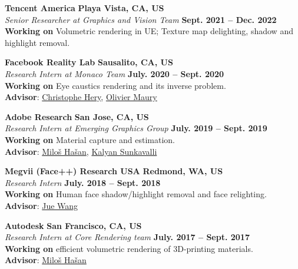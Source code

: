 \documentclass[margin,line]{resume}
\begin{document}
\begin{resume}
	\vspace{0.0mm}

	\textbf{Tencent America} \hfill \textbf{Playa Vista, CA, US} \\
	\textsl{Senior Researcher at Graphics and Vision Team} \hfill \textbf{Sept. 2021 -- Dec. 2022}\\
	\textbf{Working on} Volumetric rendering in UE; Texture map delighting, shadow and highlight removal.\\
	
	\vspace{0.0mm}

	\textbf{Facebook Reality Lab} \hfill \textbf{Sausalito, CA, US} \\
	\textsl{Research Intern at Monaco Team} \hfill \textbf{July. 2020 -- Sept. 2020}\\
	\textbf{Working on} Eye caustics rendering and its inverse problem.\\
	\textbf{Advisor}: \href{https://graphics.pixar.com/library/indexAuthorChristophe_Hery.html}{Christophe Hery}, \href{https://www.imdb.com/name/nm1436524/}{Olivier Maury}       

    \vspace{0.0mm}

	\textbf{Adobe Research} \hfill \textbf{San Jose, CA, US} \\
	\textsl{Research Intern at Emerging Graphics Group} \hfill \textbf{July. 2019 -- Sept. 2019}\\
	\textbf{Working on} Material capture and estimation.\\
	\textbf{Advisor}: \href{http://miloshasan.net/}{Milo\v{s} Ha\v{s}an}, \href{https://research.adobe.com/person/kalyan-sunkavalli/}{Kalyan Sunkavalli}       

    \vspace{0.0mm}

	\textbf{Megvii (Face++) Research USA} \hfill \textbf{Redmond, WA, US} \\
	\textsl{Research Intern} \hfill \textbf{July. 2018 -- Sept. 2018}\\
	\textbf{Working on} Human face shadow/highlight removal and face relighting.\\
	\textbf{Advisor}: \href{https://www.juew.org/}{Jue Wang}        

    \vspace{0.0mm}

    \textbf{Autodesk} \hfill \textbf{San Francisco, CA, US} \\
    \textsl{Research Intern at Core Rendering team} \hfill \textbf{July. 2017 -- Sept. 2017}\\
    \textbf{Working on} efficient volumetric rendering of 3D-printing materials.\\
    \textbf{Advisor}: \href{http://miloshasan.net/}{Milo\v{s} Ha\v{s}an}       
    

\end{resume}
\end{document}
